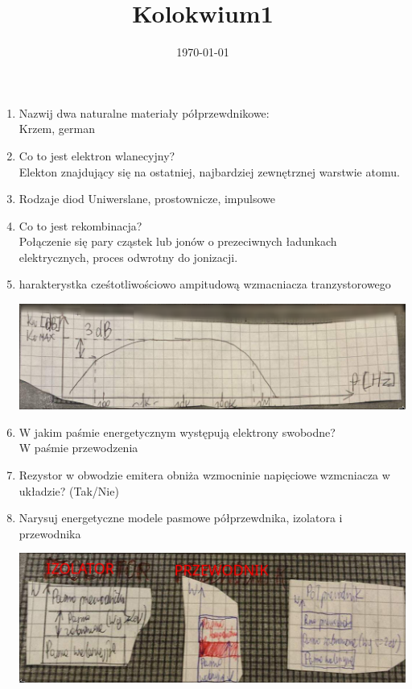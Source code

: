 \documentclass[11pt]{article}
\author{\textcopyleft}
\date{\today}
\title{Kolokwium1}
\begin{document}
\maketitle
\tableofcontents

\begin{enumerate}
\item Nazwij dwa naturalne materiały półprzewdnikowe:\\\empty
Krzem, german
\item Co to jest elektron wlanecyjny?\\\empty
Elekton znajdujący się na ostatniej, najbardziej zewnętrznej warstwie atomu.
\item Rodzaje diod
Uniwerslane, prostownicze, impulsowe
\item Co to jest rekombinacja?\\\empty
Połączenie się pary cząstek lub jonów o prezeciwnych ładunkach elektrycznych, proces odwrotny do jonizacji.
\item harakterystka cześtotliwościowo ampitudową wzmacniacza tranzystorowego \begin{center}
\includegraphics[width=.9\linewidth]{charakterystkaczestotliwosociowamipitudowa.png}
\end{center}
\item W jakim paśmie energetycznym występują elektrony swobodne?\\\empty
W paśmie przewodzenia
\item Rezystor w obwodzie emitera obniża wzmocninie napięciowe wzmcniacza w układzie? (Tak/Nie)
\item Narysuj energetyczne modele pasmowe półprzewdnika, izolatora i przewodnika \begin{center}
\includegraphics[width=.9\linewidth]{modelepasmowe.png}

\end{center}
\end{enumerate}
\end{document}
